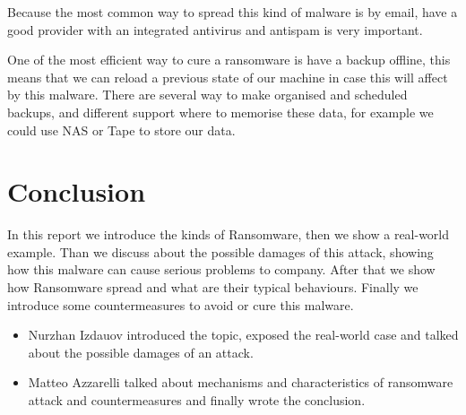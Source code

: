 \documentclass{article}
\begin{document}
    Because the most common way to spread this kind of malware is by email, have a good provider with an integrated antivirus and antispam is very important.
    
    One of the most efficient way to cure a ransomware is have a backup offline, this means that we can reload a previous state of our machine in case this will affect by this malware. There are several way to make organised and scheduled backups, and different support where to memorise these data, for example we could use NAS or Tape to store our data. \cite{inproceedings}

\section{Conclusion}
    In this report we introduce the kinds of Ransomware, then we show a real-world example. Than we discuss about the possible damages of this attack, showing how this malware can cause serious problems to company. After that we show how Ransomware spread and what are their typical behaviours. Finally we introduce some countermeasures to avoid or cure this malware.
    
    \begin{itemize}
        \item Nurzhan Izdauov introduced the topic, exposed the real-world case and talked about the possible damages of an attack.
        \item Matteo Azzarelli talked about mechanisms and characteristics of ransomware attack and countermeasures and finally wrote the conclusion.
    \end{itemize}
    



\end{document}
